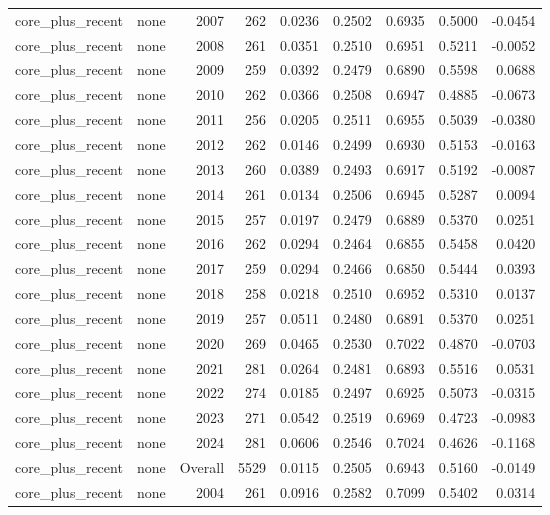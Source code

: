 \begin{table}[t]
\begin{tabular}{@{} l l r r r r r r r @{} }
      core\_plus\_recent & none & 2007 & 262 & 0.0236 & 0.2502 & 0.6935 & 0.5000 & -0.0454 \\
      core\_plus\_recent & none & 2008 & 261 & 0.0351 & 0.2510 & 0.6951 & 0.5211 & -0.0052 \\
      core\_plus\_recent & none & 2009 & 259 & 0.0392 & 0.2479 & 0.6890 & 0.5598 & 0.0688 \\
      core\_plus\_recent & none & 2010 & 262 & 0.0366 & 0.2508 & 0.6947 & 0.4885 & -0.0673 \\
      core\_plus\_recent & none & 2011 & 256 & 0.0205 & 0.2511 & 0.6955 & 0.5039 & -0.0380 \\
      core\_plus\_recent & none & 2012 & 262 & 0.0146 & 0.2499 & 0.6930 & 0.5153 & -0.0163 \\
      core\_plus\_recent & none & 2013 & 260 & 0.0389 & 0.2493 & 0.6917 & 0.5192 & -0.0087 \\
      core\_plus\_recent & none & 2014 & 261 & 0.0134 & 0.2506 & 0.6945 & 0.5287 & 0.0094 \\
      core\_plus\_recent & none & 2015 & 257 & 0.0197 & 0.2479 & 0.6889 & 0.5370 & 0.0251 \\
      core\_plus\_recent & none & 2016 & 262 & 0.0294 & 0.2464 & 0.6855 & 0.5458 & 0.0420 \\
      core\_plus\_recent & none & 2017 & 259 & 0.0294 & 0.2466 & 0.6850 & 0.5444 & 0.0393 \\
      core\_plus\_recent & none & 2018 & 258 & 0.0218 & 0.2510 & 0.6952 & 0.5310 & 0.0137 \\
      core\_plus\_recent & none & 2019 & 257 & 0.0511 & 0.2480 & 0.6891 & 0.5370 & 0.0251 \\
      core\_plus\_recent & none & 2020 & 269 & 0.0465 & 0.2530 & 0.7022 & 0.4870 & -0.0703 \\
      core\_plus\_recent & none & 2021 & 281 & 0.0264 & 0.2481 & 0.6893 & 0.5516 & 0.0531 \\
      core\_plus\_recent & none & 2022 & 274 & 0.0185 & 0.2497 & 0.6925 & 0.5073 & -0.0315 \\
      core\_plus\_recent & none & 2023 & 271 & 0.0542 & 0.2519 & 0.6969 & 0.4723 & -0.0983 \\
      core\_plus\_recent & none & 2024 & 281 & 0.0606 & 0.2546 & 0.7024 & 0.4626 & -0.1168 \\
      core\_plus\_recent & none & Overall & 5529 & 0.0115 & 0.2505 & 0.6943 & 0.5160 & -0.0149 \\
      core\_plus\_recent & none & 2004 & 261 & 0.0916 & 0.2582 & 0.7099 & 0.5402 & 0.0314 \\

\end{tabular}
\end{table}
